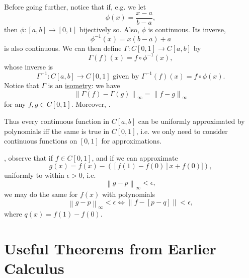 \documentclass[notoc,notitlepage]{tufte-book}
\newcommand{\norm}[1]{\left\| #1 \right\|}
\begin{document}
Before going further, notice that if, e.g. we let
\begin{equation*}
  \phi(x) = \frac{x - a}{b - a},
\end{equation*}
then $\phi : [a, b] \to [0, 1]$ bijectively so. Also, $\phi$ is continuous. Its inverse,
\begin{equation*}
  \phi^{-1}(x) = x(b - a) + a
\end{equation*}
is also continuous. We can then define $\Gamma: C[0, 1] \to C[a, b]$ by
\begin{equation*}
  \Gamma(f)(x) = f \circ \phi^{-1}(x),
\end{equation*}
whose inverse is
\begin{equation*}
  \Gamma^{-1} : C[a, b] \to C[0, 1] \text{ given by } \Gamma^{-1}(f)(x) = f \circ \phi(x).
\end{equation*}
Notice that $\Gamma$ is an \hyperref[defn:isometry]{isometry}: we have
\begin{equation*}
  \norm{ \Gamma(f) - \Gamma(g) }_\infty = \norm{ f - g }_\infty
\end{equation*}
for any $f, g \in C[0, 1]$. Moreover, .

Thus every continuous function in $C[a, b]$ can be uniformly approximated by polynomials iff the same is true in $C[0, 1]$, i.e. we only need to consider continuous functions on $[0, 1]$ for approximations.

, observe that if $f \in C[0, 1]$, and if we can approximate
\begin{equation*}
  g(x) = f(x) - ([f(1) - f(0)] x + f(0)]),
\end{equation*}
uniformly to within $\epsilon > 0$, i.e.
\begin{equation*}
  \norm{ g - p }_\infty < \epsilon,
\end{equation*}
we may do the same for $f(x)$ with polynomials
\begin{equation*}
  \norm{g - p}_\infty < \epsilon \iff \norm{ f - [p - q] } < \epsilon,
\end{equation*}
where $q(x) = f(1) - f(0)$.




\appendix

\chapter{Useful Theorems from Earlier Calculus}%
\label{chp:useful_theorems_from_earlier_calculus}
\end{document}
